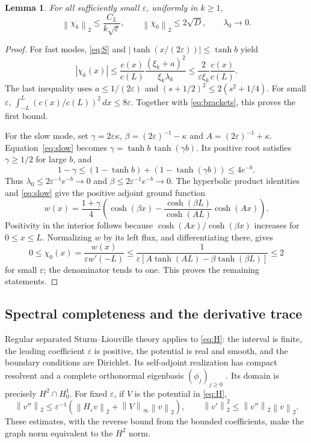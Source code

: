 \documentclass[11pt]{article}
\numberwithin{equation}{section}
\newtheorem{lemma}[theorem]{Lemma}
\newcommand{\eps}{\varepsilon}
\newcommand{\norm}[1]{\left\|#1\right\|}
\begin{document}
\begin{lemma}\label{lem:norms}
For all sufficiently small $\eps$, uniformly in $k\ge1$,
\begin{equation}\label{eq:norms}
 \norm{\chi_k}_2\le\frac{C_L}{k\sqrt\eps},\qquad
 \norm{\chi_0}_2\le2\sqrt D,\qquad \lambda_0\longrightarrow0.
\end{equation}
\end{lemma}
\begin{proof}
For fast modes, \eqref{eq:S} and $|\tanh(x/(2\eps))|\le\tanh b$ yield
\[
 |\chi_k(x)|\le\frac{c(x)}{c(L)}
       \frac{(\xi_k+a)^2}{\xi_k\lambda_k}
 \le\frac{2}{\eps\xi_k}\frac{c(x)}{c(L)}.
\]
The last inequality uses $a\le1/(2\eps)$ and
$(s+1/2)^2\le2(s^2+1/4)$.
For small $\eps$,
$\int_{-L}^L(c(x)/c(L))^2\,dx\le8\eps$.
Together with \eqref{eq:brackets}, this proves the first bound.

For the slow mode, set $\gamma=2\eps\kappa$,
$\beta=(2\eps)^{-1}-\kappa$ and $A=(2\eps)^{-1}+\kappa$.
Equation~\eqref{eq:slow} becomes
$\gamma=\tanh b\,\tanh(\gamma b)$.
Its positive root satisfies $\gamma\ge1/2$ for large $b$, and
\[
 1-\gamma\le(1-\tanh b)+(1-\tanh(\gamma b))\le4e^{-b}.
\]
Thus $\lambda_0\le2\eps^{-1}e^{-b}\to0$ and
$\beta\le2\eps^{-1}e^{-b}\to0$.
The hyperbolic product identities and \eqref{eq:slow} give the positive
adjoint ground function
\[
 w(x)=\frac{1+\gamma}{4}
 \left(\cosh(\beta x)
       -\frac{\cosh(\beta L)}{\cosh(AL)}\cosh(Ax)\right).
\]
Positivity in the interior follows because
$\cosh(Ax)/\cosh(\beta x)$ increases for $0\le x\le L$.
Normalizing $w$ by its left flux, and differentiating there, gives
\[
 0\le\chi_0(x)=\frac{w(x)}{\eps w'(-L)}
 \le\frac1{\eps[A\tanh(AL)-\beta\tanh(\beta L)]}\le2
\]
for small $\eps$; the denominator tends to one.
This proves the remaining statements.
\end{proof}

\subsection{Spectral completeness and the derivative trace}\label{sec:density}

Regular separated Sturm--Liouville theory applies to \eqref{eq:H}:
the interval is finite, the leading coefficient $\eps$ is positive,
the potential is real and smooth, and the boundary conditions are
Dirichlet. Its self-adjoint realization has compact resolvent and a
complete orthonormal eigenbasis $(\phi_j)_{j\ge0}$
\cite[Theorems 9.6 and 9.10]{Teschl}.
Its domain is precisely $H^2\cap H_0^1$.
For fixed $\eps$, if $V$ is the potential in \eqref{eq:H},
\[
 \norm{v''}_2\le\eps^{-1}(\norm{H_\eps v}_2+\norm V_\infty\norm v_2),
 \qquad \norm{v'}_2^2\le\norm{v''}_2\norm v_2.
\]
These estimates, with the reverse bound from the bounded coefficients,
make the graph norm equivalent to the $H^2$ norm.
\end{document}
